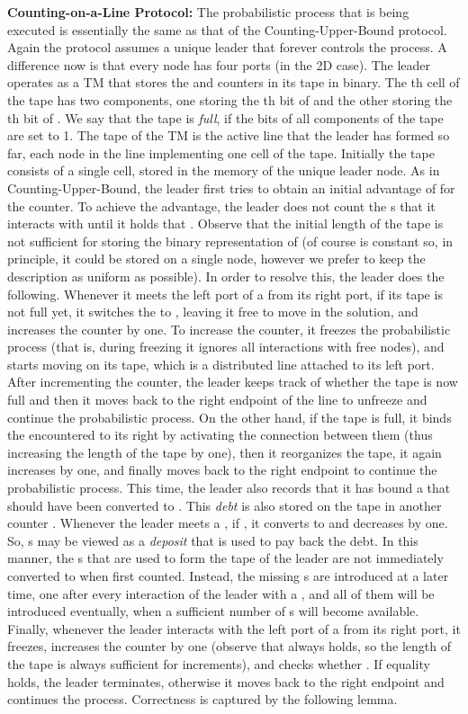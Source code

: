 \documentclass[oribibl, 11pt]{llncs}
\begin{document}
\noindent\textbf{Counting-on-a-Line Protocol:} The probabilistic process that is being executed is essentially the same as that of the Counting-Upper-Bound protocol. Again the protocol assumes a unique leader that forever controls the process. A difference now is that every node has four ports (in the 2D case). The leader operates as a TM that stores the  and  counters in its tape in binary. The th cell of the tape has two components, one storing the th bit of  and the other storing the th bit of . We say that the tape is \emph{full}, if the bits of all  components of the tape are set to 1. The tape of the TM is the active line that the leader has formed so far, each node in the line implementing one cell of the tape. Initially the tape consists of a single cell, stored in the memory of the unique leader node. As in Counting-Upper-Bound, the leader first tries to obtain an initial advantage of  for the  counter. To achieve the advantage, the leader does not count the s that it interacts with until it holds that . Observe that the initial length of the tape is not sufficient for storing the binary representation of  (of course  is constant so, in principle, it could be stored on a single node, however we prefer to keep the description as uniform as possible). In order to resolve this, the leader does the following. Whenever it meets the left port of a  from its right port, if its tape is not full yet, it switches the  to , leaving it free to move in the solution, and increases the  counter by one. To increase the counter, it freezes the probabilistic process (that is, during freezing it ignores all interactions with free nodes), and starts moving on its tape, which is a distributed line attached to its left port. After incrementing the counter, the leader keeps track of whether the tape is now full and then it moves back to the right endpoint of the line to unfreeze and continue the probabilistic process. On the other hand, if the tape is full, it binds the encountered  to its right by activating the connection between them (thus increasing the length of the tape by one), then it reorganizes the tape, it again increases  by one, and finally moves back to the right endpoint to continue the probabilistic process. This time, the leader also records that it has bound a  that should have been converted to . This \emph{debt} is also stored on the tape in another counter . Whenever the leader meets a , if , it converts  to  and decreases  by one. So, s may be viewed as a \emph{deposit} that is used to pay back the debt. In this manner, the s that are used to form the tape of the leader are not immediately converted to  when first counted. Instead, the missing s are introduced at a later time, one after every interaction of the leader with a , and all of them will be introduced eventually, when a sufficient number of s will become available. Finally, whenever the leader interacts with the left port of a  from its right port, it freezes, increases the  counter by one (observe that  always holds, so the length of the tape is always sufficient for  increments), and checks whether . If equality holds, the leader terminates, otherwise it moves back to the right endpoint and continues the process. Correctness is captured by the following lemma.
\end{document}
